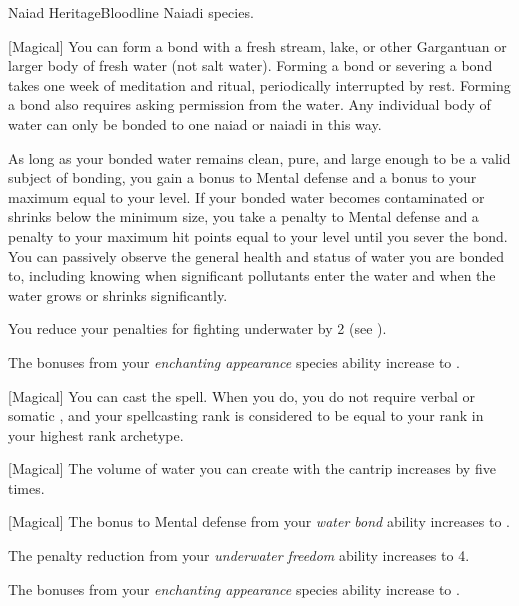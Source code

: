     \begin{feat}{Naiad Heritage}{Bloodline}
        \featpre Naiadi species.

        [Magical] You can form a bond with a fresh stream, lake, or other Gargantuan or larger body of fresh water (not salt water).
        Forming a bond or severing a bond takes one week of meditation and ritual, periodically interrupted by rest.
        Forming a bond also requires asking permission from the water.
        Any individual body of water can only be bonded to one naiad or naiadi in this way.

        As long as your bonded water remains clean, pure, and large enough to be a valid subject of bonding, you gain a  bonus to Mental defense and a bonus to your maximum  equal to your level.
        If your bonded water becomes contaminated or shrinks below the minimum size, you take a  penalty to Mental defense and a penalty to your maximum hit points equal to your level until you sever the bond.
        You can passively observe the general health and status of water you are bonded to, including knowing when significant pollutants enter the water and when the water grows or shrinks significantly.

         You reduce your penalties for fighting underwater by 2 (see ).

         The bonuses from your \textit{enchanting appearance} species ability increase to .

        [Magical] You can cast the  spell.
        When you do, you do not require verbal or somatic , and your spellcasting rank is considered to be equal to your rank in your highest rank archetype.

        [Magical] The volume of water you can create with the  cantrip increases by five times.

        [Magical] The bonus to Mental defense from your \textit{water bond} ability increases to .

         The penalty reduction from your \textit{underwater freedom} ability increases to 4.

         The bonuses from your \textit{enchanting appearance} species ability increase to .


\end{feat}
